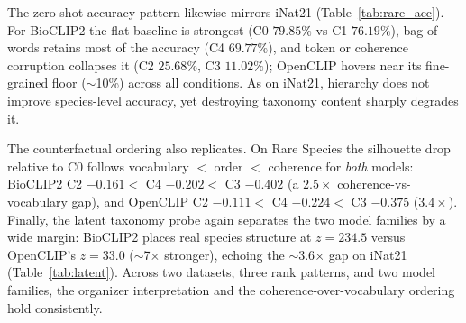 The zero-shot accuracy pattern likewise mirrors iNat21 (Table~\ref{tab:rare_acc}).
For BioCLIP2 the flat baseline is strongest (C0 $79.85\%$ vs C1 $76.19\%$),
bag-of-words retains most of the accuracy (C4 $69.77\%$), and token or coherence
corruption collapses it (C2 $25.68\%$, C3 $11.02\%$); OpenCLIP hovers near its
fine-grained floor ($\sim$10\%) across all conditions. As on iNat21, hierarchy does
not improve species-level accuracy, yet destroying taxonomy content sharply
degrades it.

The counterfactual ordering also replicates. On Rare Species the silhouette drop
relative to C0 follows vocabulary $<$ order $<$ coherence for \emph{both} models:
BioCLIP2 C2 $-0.161 <$ C4 $-0.202 <$ C3 $-0.402$ (a $2.5\times$ coherence-vs-vocabulary
gap), and OpenCLIP C2 $-0.111 <$ C4 $-0.224 <$ C3 $-0.375$ ($3.4\times$). Finally,
the latent taxonomy probe again separates the two model families by a wide margin:
BioCLIP2 places real species structure at $z = 234.5$ versus OpenCLIP's $z = 33.0$
($\sim$7$\times$ stronger), echoing the $\sim$3.6$\times$ gap on iNat21
(Table~\ref{tab:latent}). Across two datasets, three rank patterns, and two model
families, the organizer interpretation and the coherence-over-vocabulary ordering
hold consistently.
